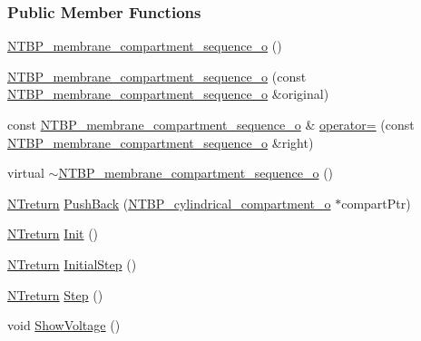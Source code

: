 \subsubsection*{Public Member Functions}
\begin{DoxyCompactItemize}
\item 
\hyperlink{class_n_t_b_p__membrane__compartment__sequence__o_af92127f4d9ebe16c12a009cbe68f4928}{NTBP\_\-membrane\_\-compartment\_\-sequence\_\-o} ()
\item 
\hyperlink{class_n_t_b_p__membrane__compartment__sequence__o_ae2e80da1f85b521909daed26a2d8d8be}{NTBP\_\-membrane\_\-compartment\_\-sequence\_\-o} (const \hyperlink{class_n_t_b_p__membrane__compartment__sequence__o}{NTBP\_\-membrane\_\-compartment\_\-sequence\_\-o} \&original)
\item 
const \hyperlink{class_n_t_b_p__membrane__compartment__sequence__o}{NTBP\_\-membrane\_\-compartment\_\-sequence\_\-o} \& \hyperlink{class_n_t_b_p__membrane__compartment__sequence__o_ab79f59004d4c6ca7fb4c110defdb8ecd}{operator=} (const \hyperlink{class_n_t_b_p__membrane__compartment__sequence__o}{NTBP\_\-membrane\_\-compartment\_\-sequence\_\-o} \&right)
\item 
virtual \hyperlink{class_n_t_b_p__membrane__compartment__sequence__o_a32f1f07339ae270c8a8827613c9da8ea}{$\sim$NTBP\_\-membrane\_\-compartment\_\-sequence\_\-o} ()
\item 
\hyperlink{nt__types_8h_ab9564ee8f091e809d21b8451c6683c53}{NTreturn} \hyperlink{class_n_t_b_p__membrane__compartment__sequence__o_ae99d54beb3066cf9472c5877014737f2}{PushBack} (\hyperlink{class_n_t_b_p__cylindrical__compartment__o}{NTBP\_\-cylindrical\_\-compartment\_\-o} $\ast$compartPtr)
\item 
\hyperlink{nt__types_8h_ab9564ee8f091e809d21b8451c6683c53}{NTreturn} \hyperlink{class_n_t_b_p__membrane__compartment__sequence__o_a9c13ef203afbcb083c06e84e756add52}{Init} ()
\item 
\hyperlink{nt__types_8h_ab9564ee8f091e809d21b8451c6683c53}{NTreturn} \hyperlink{class_n_t_b_p__membrane__compartment__sequence__o_a2eb41ac0fef097ed3d03cc2599abb847}{InitialStep} ()
\item 
\hyperlink{nt__types_8h_ab9564ee8f091e809d21b8451c6683c53}{NTreturn} \hyperlink{class_n_t_b_p__membrane__compartment__sequence__o_a28b8ea0192931f0e4961ff9d756322e2}{Step} ()
\item 
void \hyperlink{class_n_t_b_p__membrane__compartment__sequence__o_a9b8a1a2494958fb2c14f3304a9571aff}{ShowVoltage} ()
\item 

\end{DoxyCompactItemize}
